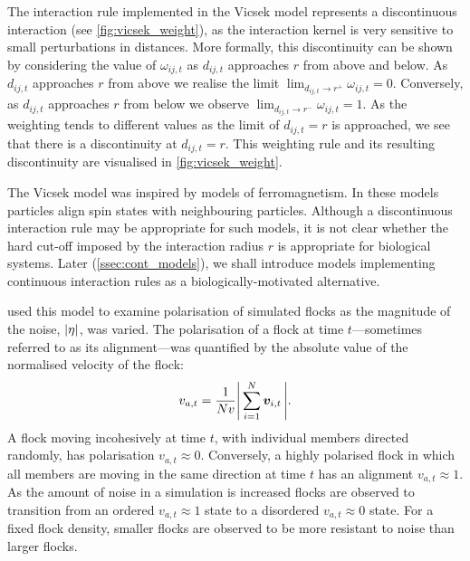 The interaction rule implemented in the Vicsek model represents a discontinuous
interaction (see \cref{fig:vicsek_weight}), as the interaction kernel is very
sensitive to small perturbations in distances. More formally, this
discontinuity can be shown by considering the value of $\omega_{ij, t}$ as
$d_{ij,t}$ approaches $r$ from above and below. As $d_{ij,t}$ approaches $r$
from above we realise the limit $\lim_{d_{ij,t} \rightarrow r^+} \omega_{ij,t}
= 0$. Conversely, as $d_{ij,t}$ approaches $r$ from below we observe
$\lim_{d_{ij,t} \rightarrow r^-} \omega_{ij,t} = 1$. As the weighting tends to
different values as the limit of $d_{ij,t}=r$ is approached, we see that there
is a discontinuity at $d_{ij,t}=r$. This weighting rule and its resulting
discontinuity are visualised in \cref{fig:vicsek_weight}.

The Vicsek model was inspired by models of ferromagnetism. In these models
particles align spin states with neighbouring particles. Although a
discontinuous interaction rule may be appropriate for such models, it is not
clear whether the hard cut-off imposed by the interaction radius $r$ is
appropriate for biological systems. Later (\cref{ssec:cont_models}), we shall
introduce models implementing continuous interaction rules as a
biologically-motivated alternative.

\textcite{vicsek95} used this model to examine polarisation of simulated flocks
as the magnitude of the noise, $\abs{\eta}$, was varied. The polarisation of a
flock at time $t$---sometimes referred to as its alignment---was quantified by
the absolute value of the normalised velocity of the flock:
\begin{equation}
  \label{eq:alignment}
  v_{a,t} = \frac{1}{Nv} \abs{\,\sum_{i=1}^N \bm{v}_{i,t}\,}.
\end{equation}
A flock moving incohesively at time $t$, with individual members directed
randomly, has polarisation $v_{a,t}\approx0$. Conversely, a highly polarised
flock in which all members are moving in the same direction at time $t$ has an
alignment $v_{a,t}\approx1$. As the amount of noise in a simulation is
increased flocks are observed to transition from an ordered $v_{a,t}\approx1$
state to a disordered $v_{a,t}\approx0$ state. For a fixed flock density,
smaller flocks are observed to be more resistant to noise than larger flocks.

